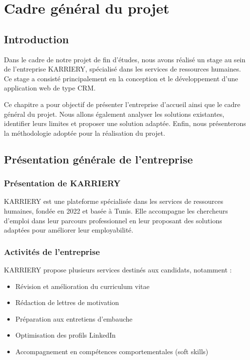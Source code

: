 \documentclass[12pt,a4paper]{report}
\begin{document}
\justifying

\tableofcontents
\clearpage

\chapter{Cadre général du projet}

\section{Introduction}

Dans le cadre de notre projet de fin d’études, nous avons réalisé un stage au sein de l’entreprise KARRIERY, spécialisé dans les services de ressources humaines. Ce stage a consisté principalement en la conception et le développement d’une application web de type CRM.

Ce chapitre a pour objectif de présenter l’entreprise d’accueil ainsi que le cadre général du projet. Nous allons également analyser les solutions existantes, identifier leurs limites et proposer une solution adaptée. Enfin, nous présenterons la méthodologie adoptée pour la réalisation du projet.

\section{Présentation générale de l’entreprise}

\subsection{Présentation de KARRIERY}

KARRIERY est une plateforme spécialisée dans les services de ressources humaines, fondée en 2022 et basée à Tunis. Elle accompagne les chercheurs d’emploi dans leur parcours professionnel en leur proposant des solutions adaptées pour améliorer leur employabilité.

\subsection{Activités de l’entreprise}

KARRIERY propose plusieurs services destinés aux candidats, notamment :

\begin{itemize}
\item Révision et amélioration du curriculum vitae
\item Rédaction de lettres de motivation
\item Préparation aux entretiens d’embauche
\item Optimisation des profils LinkedIn
\item Accompagnement en compétences comportementales (soft skills)
\end{itemize}
\end{document}
